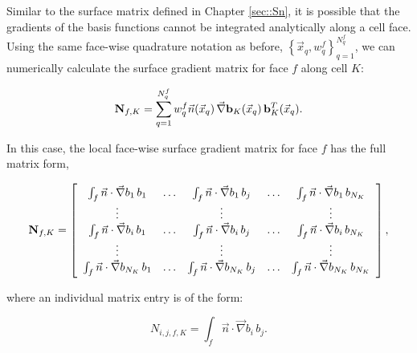 Similar to the surface matrix defined in Chapter \ref{sec::Sn}, it is possible that the gradients of the basis functions cannot be integrated analytically along a cell face. Using the same face-wise quadrature notation as before, $\left\{  \vec{x}_q , w_q^{f}  \right\}_{q=1}^{N_q^f}$, we can numerically calculate the surface gradient matrix for face $f$ along cell $K$:

\begin{equation}
\label{eq::DSA_surface_gradient_matrix_numerical}
{\bf N}_{f,K} =    \sum_{q = 1}^{N_q^f} w_{q}^f \vec{n} (\vec{x}_q) \, \vec{\nabla} {\bf b}_K (\vec{x}_q) \, {\bf b}_K^T (\vec{x}_q) .
\end{equation}

In this case, the local face-wise surface gradient matrix for face $f$ has the full matrix form,

\begin{equation}
\label{eq::DSA_surface_gradient_matrix_array}
{\bf N}_{f,K} =   \left[
\begin{array} {ccccc}
	\int_f \vec{n} \cdot\vec{\nabla}  b_1 \, b_1  & \ldots & \int_f \vec{n} \cdot \vec{\nabla} b_1 \, b_j  & \ldots & \int_f \vec{n} \cdot \vec{\nabla} b_1 \, b_{N_K} \\
	\vdots  &  & \vdots  &  & \vdots \\
	\int_f \vec{n}\cdot  \vec{\nabla} b_i \, b_1  & \ldots & \int_f \vec{n} \cdot\vec{\nabla}  b_i \, b_j  & \ldots & \int_f \vec{n}\cdot\vec{\nabla}  b_i \, b_{N_K} \\
	\vdots  &  & \vdots  &  & \vdots \\
	\int_f \vec{n} \cdot  \vec{\nabla} b_{N_K} \, b_1  & \ldots & \int_f \vec{n} \cdot  \vec{\nabla} b_{N_K} \, b_j  & \ldots & \int_f \vec{n} \cdot \vec{\nabla}  b_{N_K} \, b_{N_K} \\
\end{array}
\right] ,
\end{equation}

\noindent where an individual matrix entry is of the form:

\begin{equation}
\label{eq::DSA_surface_gradient_matrix_entry}
N_{i,j,f,K} =  \int_f \vec{n} \cdot  \vec{\nabla} b_i \, b_j .
\end{equation}

